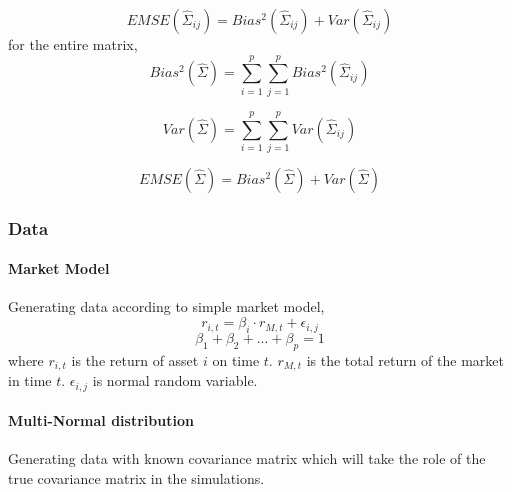 \documentclass[letterpaper]{article}
\begin{document}
	\[
	EMSE(\hat{\Sigma}_{ij}) = Bias^2( \hat{\Sigma}_{ij} ) + Var(\hat{\Sigma}_{ij})
	\]
	for the entire matrix, 
	\[Bias^2( \hat{\Sigma}) = \sum_{i=1}^{p} \sum_{j=1}^{p} Bias^2( \hat{\Sigma}_{ij} )
	\]
	
	\[Var( \hat{\Sigma}) = \sum_{i=1}^{p} \sum_{j=1}^{p} Var(\hat{\Sigma}_{ij})
	\]
	
	\[
	EMSE(\hat{\Sigma}) = Bias^2( \hat{\Sigma} ) + Var(\hat{\Sigma})
	\]
	
	\subsubsection{Data}
	
	\paragraph{Market Model}
	Generating data according to simple market model, 
	\[r_{i,t} = \beta_{i} \cdot r_{M, t} + \epsilon_{i,j} \]
	\[ \beta_{1} +  \beta_{2} + ... +  \beta_{p}  = 1\]
	where \(r_{i,t}\) is the return of asset \(i\) on time \(t\). \(r_{M,t}\) is the total return of the market in time \(t\). \(\epsilon_{i,j}\) is normal random variable. 
	
	\paragraph{Multi-Normal distribution} Generating data with known covariance matrix which will take the role of the true covariance matrix in the simulations. 
	
\end{document}
